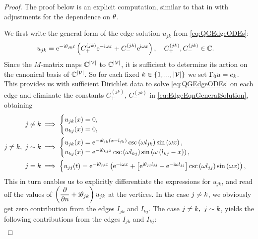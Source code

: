 \begin{proof}
	The proof below is an explicit computation, similar to that in \cite{ershova2014isospectrality} with adjustments for the dependence on $\theta$.
	
	We first write the general form of the edge solution $u_{jk}$ from \eqref{eq:QGEdgeODEs}:
	\begin{align} \label{eq:EdgeEqnGeneralSolution}
		u_{jk} &= \mathrm{e}^{-\mathrm{i}\theta_{jk}t}\left(  C_{+}^{(jk)}\mathrm{e}^{-\mathrm{i}\omega x} + C_{-}^{(jk)}\mathrm{e}^{\mathrm{i}\omega x}  \right),
		\quad C_{+}^{(jk)}, C_{-}^{(jk)}\in\mathbb{C}.
	\end{align}
	Since the $M$-matrix maps $\mathbb{C}^{\left\lvert \mathcal{V} \right\rvert}$ to $\mathbb{C}^{\left\lvert \mathcal{V} \right\rvert}$, it is sufficient to determine its action on the canonical basis of $\mathbb{C}^{\left\lvert \mathcal{V} \right\rvert}$.
	So for each fixed $k\in\left\{ 1,...,\left\lvert \mathcal{V} \right\rvert \right\}$ we set $\Gamma_0 u = e_k$.
	This provides us with sufficient Dirichlet data to solve \eqref{eq:QGEdgeODEs} on each edge and eliminate the constants $C_{+}^{(jk)}$, $C_{-}^{(jk)}$ in \eqref{eq:EdgeEqnGeneralSolution}, obtaining
	\begin{align*}
		j\not\sim k &\implies
		\begin{cases}
			u_{jk}(x) = 0, \\
			u_{kj}(x) = 0,
		\end{cases} \\
		j\neq k, \ j\sim k &\implies
		\begin{cases}
			u_{jk}(x) = \mathrm{e}^{-\mathrm{i}\theta_{jk}\left( x-l_{jk} \right)}\csc\left( \omega l_{jk} \right)\sin\left( \omega x \right), \\
			u_{kj}(x) = \mathrm{e}^{-\mathrm{i}\theta_{kj}x}\csc\left( \omega l_{kj} \right)\sin\left( \omega \left( l_{kj}-x \right) \right),
		\end{cases} \\
		j = k &\implies 
		\begin{cases}
			u_{jj}(t) = \mathrm{e}^{-\mathrm{i}\theta_{jj}x} \left(  \mathrm{e}^{-\mathrm{i}\omega x} + \left[ \mathrm{e}^{\mathrm{i}\theta_{jj}l_{jj}}-\mathrm{e}^{-\mathrm{i}\omega l_{jj}} \right]\csc\left( \omega l_{jj} \right)\sin\left( \omega x \right)   \right),
		\end{cases}
	\end{align*}
	This in turn enables us to explicitly differentiate the expressions for $u_{jk}$, and read off the values of $\left( \dfrac{\partial }{\partial n}+\mathrm{i}\theta_{jk} \right)u_{jk}$ at the vertices.
	In the case $j\not\sim k$, we obviously get zero contribution from the edges $I_{jk}$ and $I_{kj}$.
	The case $j\neq k, \ j\sim k$, yields the following contributions from the edges $I_{jk}$ and $I_{kj}$:
	\begin{align*}

\end{align*}
\end{proof}
